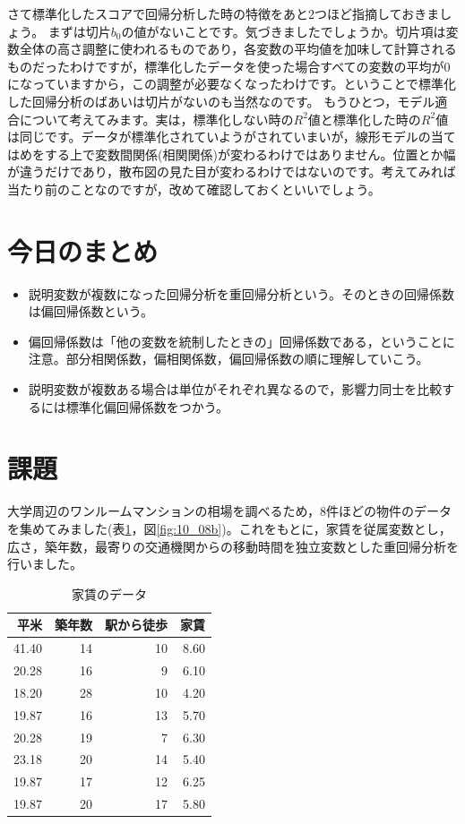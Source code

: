 \documentclass{ltjbook}
\begin{document}
さて標準化したスコアで回帰分析した時の特徴をあと2つほど指摘しておきましょう。
まずは切片$b_0$の値がないことです。気づきましたでしょうか。切片項は変数全体の高さ調整に使われるものであり，各変数の平均値を加味して計算されるものだったわけですが，標準化したデータを使った場合すべての変数の平均が0になっていますから，この調整が必要なくなったわけです。ということで標準化した回帰分析のばあいは切片がないのも当然なのです。
もうひとつ，モデル適合について考えてみます。実は，標準化しない時の$R^2$値と標準化した時の$R^2$値は同じです。データが標準化されていようがされていまいが，線形モデルの当てはめをする上で変数間関係(相関関係)が変わるわけではありません。位置とか幅が違うだけであり，散布図の見た目が変わるわけではないのです。考えてみれば当たり前のことなのですが，改めて確認しておくといいでしょう。


\section{今日のまとめ}
\begin{itemize}
	\item 説明変数が複数になった回帰分析を重回帰分析という。そのときの回帰係数は偏回帰係数という。
	\item 偏回帰係数は「他の変数を統制したときの」回帰係数である，ということに注意。部分相関係数，偏相関係数，偏回帰係数の順に理解していこう。
	\item 説明変数が複数ある場合は単位がそれぞれ異なるので，影響力同士を比較するには標準化偏回帰係数をつかう。
\end{itemize}

\section{課題}

大学周辺のワンルームマンションの相場を調べるため，8件ほどの物件のデータを集めてみました(表\ref{tab:ex11_01}，図\ref{fig:10_08b})。これをもとに，家賃を従属変数とし，広さ，築年数，最寄りの交通機関からの移動時間を独立変数とした重回帰分析を行いました。

\begin{table}[ht]
	\caption{家賃のデータ}
	\label{tab:ex11_01}
	\centering
	\begin{tabular}[t]{rrrr}
		\hline
		平米    & 築年数 & 駅から徒歩 & 家賃   \\\hline
		41.40 & 14  & 10    & 8.60 \\
		20.28 & 16  & 9     & 6.10 \\
		18.20 & 28  & 10    & 4.20 \\
		19.87 & 16  & 13    & 5.70 \\
		20.28 & 19  & 7     & 6.30 \\
		23.18 & 20  & 14    & 5.40 \\
		19.87 & 17  & 12    & 6.25 \\
		19.87 & 20  & 17    & 5.80 \\
		\hline
	\end{tabular}
\end{table}
\end{document}
